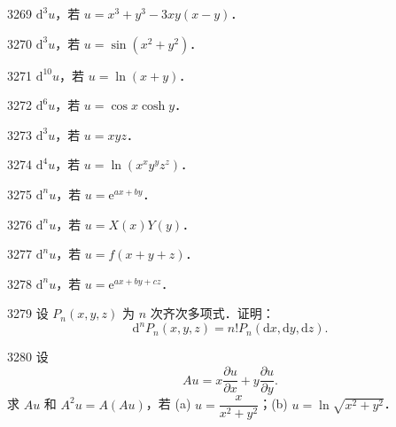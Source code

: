 
\begin{prob}[S]{3269}
$\mathrm{d}^3 u$，若 $u = x^3 + y^3 - 3xy(x-y)$．
\end{prob}

\begin{prob}[S]{3270}
$\mathrm{d}^3 u$，若 $u = \sin(x^2+y^2)$．
\end{prob}

\begin{prob}[S]{3271}
$\mathrm{d}^{10} u$，若 $u = \ln(x+y)$．
\end{prob}

\begin{prob}[S]{3272}
$\mathrm{d}^6 u$，若 $u = \cos x \cosh y$．
\end{prob}

\begin{prob}[S]{3273}
$\mathrm{d}^3 u$，若 $u = xyz$．
\end{prob}

\begin{prob}[S]{3274}
$\mathrm{d}^4 u$，若 $u = \ln(x^x y^y z^z)$．
\end{prob}

\begin{prob}[S]{3275}
$\mathrm{d}^n u$，若 $u = \mathrm{e}^{ax+by}$．
\end{prob}

\begin{prob}[S]{3276}
$\mathrm{d}^n u$，若 $u = X(x)Y(y)$．
\end{prob}

\begin{prob}[S]{3277}
$\mathrm{d}^n u$，若 $u = f(x+y+z)$．
\end{prob}

\begin{prob}[S]{3278}
$\mathrm{d}^n u$，若 $u = \mathrm{e}^{ax+by+cz}$．
\end{prob}

\begin{prob}[M]{3279}
设 $P_n(x,y,z)$ 为 $n$ 次齐次多项式．证明：
\[
\mathrm{d}^n P_n(x,y,z) = n! P_n(\mathrm{d}x, \mathrm{d}y, \mathrm{d}z).
\]
\end{prob}

\begin{prob}[M]{3280}
设
\[
Au = x\frac{\partial u}{\partial x} + y\frac{\partial u}{\partial y}.
\]
求 $Au$ 和 $A^2 u = A(Au)$，若 (a) $u = \dfrac{x}{x^2+y^2}$；\qquad (b) $u = \ln\sqrt{x^2+y^2}$．
\end{prob}

